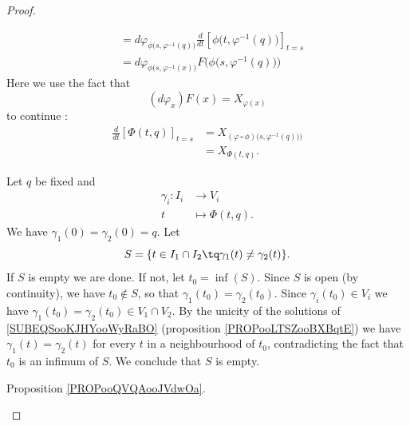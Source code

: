 \begin{proof}
\begin{subproof}
\begin{subequations}
\begin{align}
				                                             & =d\varphi_{\phi\big( s,\varphi^{-1}(q) \big)}\frac{d}{dt} \left[ \phi\big( t,\varphi^{-1}(q) \big)  \right]_{t=s} \\
				                                             & =d\varphi_{\phi\big( s,\varphi^{-1}(x) \big)}F\Big( \phi\big( s,\varphi^{-1}(q) \big) \Big)
			\end{align}
		\end{subequations}
		Here we use the fact that
		\begin{equation}
			(d\varphi_x)F(x)=X_{\varphi(x)}
		\end{equation}
		to continue :
		\begin{subequations}
			\begin{align}
				\frac{d}{dt} \left[ \Phi(t,q)  \right]_{t=s} & = X_{(\varphi\circ\phi)\big( s,\varphi^{-1}(q) \big))} \\
				                                             & =X_{\Phi(t,q)}.
			\end{align}
		\end{subequations}

		\spitem[Unicity]
		Let \( q\) be fixed and
		\begin{equation}
			\begin{aligned}
				\gamma_i\colon I_i & \to V_i               \\
				t                  & \mapsto \Phi(t,q)   .
			\end{aligned}
		\end{equation}
		We have \( \gamma_1(0)=\gamma_2(0)=q\). Let
		\begin{equation}
			S=\{ t\in I_1\cap I_2\tq \gamma_1(t)\neq \gamma_2(t) \}.
		\end{equation}
		If \( S\) is empty we are done. If not, let \( t_0=\inf(S)\). Since \( S\) is open (by continuity), we have \( t_0\not\in S\), so that \( \gamma_1(t_0)=\gamma_2(t_0)\). Since \( \gamma_i(t_0)\in V_i\) we have \( \gamma_1(t_0)=\gamma_2(t_0)\in V_1\cap V_2\). By the unicity of the solutions of \eqref{SUBEQSooKJHYooWyRaBO} (proposition \ref{PROPooLTSZooBXBqtE}) we have \( \gamma_1(t)=\gamma_2(t)\) for every \( t\) in a neighbourhood of \( t_0\), contradicting the fact that \( t_0\) is an infimum of \( S\). We conclude that \( S\) is empty.

		\spitem[Regularity]
		Proposition \ref{PROPooQVQAooJVdwOa}.
	\end{subproof}
\end{proof}


